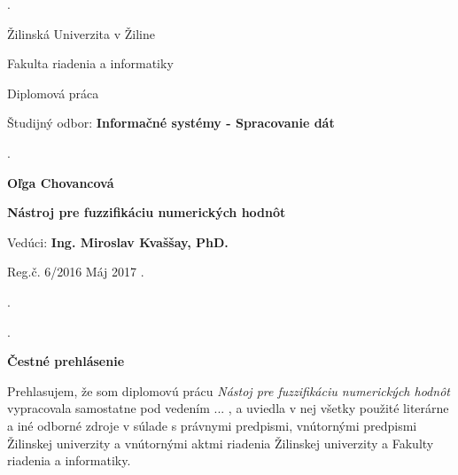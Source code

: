 \begin{titlepage}
\phantom.

\bigskip

\begin{center}
{\sc\LARGE Žilinská Univerzita v Žiline}
\medskip

{\sc\Large Fakulta riadenia a informatiky}

\vfill\vfill\vfill\vfill

{\sc\LARGE Diplomová práca}

\medskip

{\large Študijný odbor: {\bf Informačné systémy - Spracovanie dát}}
\end{center}


\vfill\vfill\vfill\vfill


\phantom.\hfill

\begin{center}
{\large\bf Oľga Chovancová}

\medskip

{\large\bf Nástroj pre fuzzifikáciu numerických hodnôt}

\medskip

Vedúci: {\bf Ing. Miroslav Kvaššay, PhD.}
\medskip
 
\hfill
Reg.č. 6/2016
\hfill
Máj 2017
\hfill\phantom.
\end{center}

\hspace{1.7cm}\phantom.

\vspace{2.9cm}

\phantom.
\end{titlepage}



\newpage

\centerline{\bf Čestné prehlásenie}

\vspace{2em}

\noindent
Prehlasujem, že som diplomovú prácu \textit{Nástoj pre fuzzifikáciu numerických hodnôt} vypracovala samostatne pod vedením ... , a uviedla v nej všetky použité literárne a iné odborné zdroje v súlade s právnymi predpismi, vnútornými predpismi Žilinskej univerzity a vnútornými aktmi riadenia Žilinskej univerzity a Fakulty riadenia a informatiky.

